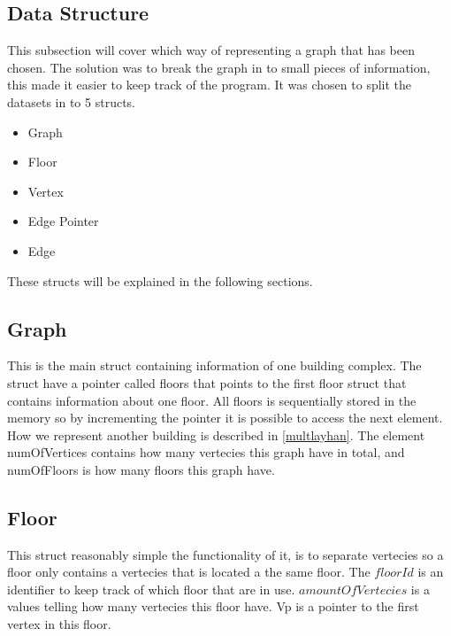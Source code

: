 
\subsection{Data Structure}
\label{sub:data_structure}

This subsection will cover which way of representing a graph that has been chosen. The solution was to break the graph in to small pieces of information, this made it easier to keep track of the program. It was chosen to split the datasets in to 5 structs.
\begin{minipage}{\linewidth}
\begin{itemize} [noitemsep]
	\item Graph
	\item Floor
	\item Vertex
	\item Edge Pointer
	\item Edge
\end{itemize}
\end{minipage}

These structs will be explained in the following sections. 

\begin{minipage}{\linewidth}
\subsection{Graph} 
This is the main struct containing information of one building complex.
The struct have a pointer called floors that points to the first floor struct that contains information about one floor. All floors is sequentially stored in the memory so by incrementing the pointer it is possible to access the next element. How we represent another building is described in \cref{multlayhan}. The element numOfVertices contains how many vertecies this graph have in total, and numOfFloors is how many floors this graph have.


 \label{Graph_struct}
\end{minipage}

\begin{minipage}{\linewidth}
\subsection{Floor} \label{subsub:floor}
This struct reasonably simple the functionality of it, is to separate vertecies so a floor only contains a vertecies that is located a the same floor. The $floorId$ is an identifier to keep track of which floor that are in use.
$amountOfVertecies$ is a values telling how many vertecies this floor have. Vp is a pointer to the first vertex in this floor.

 \label{Floor_struct}
\end{minipage}

